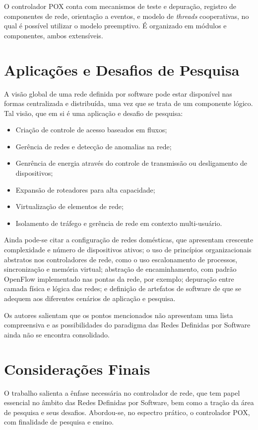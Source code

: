 O controlador POX conta com mecanismos de teste e depuração, registro de componentes de rede, orientação a eventos, e modelo de \textit{threads} cooperativas, no qual é possível utilizar o modelo preemptivo. É organizado em módulos e componentes, ambos extensíveis.


\section*{Aplicações e Desafios de Pesquisa}

A visão global de uma rede definida por software pode estar disponível nas formas centralizada e distribuída, uma vez que se trata de um componente lógico. Tal visão, que em si é uma aplicação e desafio de pesquisa:

\vspace{-15pt}
\begin{itemize}
  \item Criação de controle de acesso baseados em fluxos;
  \item Gerência de redes e detecção de anomalias na rede;
  \item Genrência de energia através do controle de transmissão ou desligamento de dispositivos;
  \item Expansão de roteadores para alta capacidade;
  \item Virtualização de elementos de rede;
  \item Isolamento de tráfego e gerência de rede em contexto multi-usuário.
\end{itemize}

Ainda pode-se citar a configuração de redes domésticas, que apresentam crescente complexidade e número de dispositivos ativos; o uso de princípios organizacionais abstratos nos controladores de rede, como o uso escalonamento de processos, sincronização e memória virtual; abstração de encaminhamento, com padrão OpenFlow implementado nas pontas da rede, por exemplo; depuração entre camada física e lógica das redes; e definição de artefatos de software de que se adequem aos diferentes cenários de aplicação e pesquisa.

Os autores salientam que os pontos mencionados não apresentam uma lista compreensiva e as possibilidades do paradigma das Redes Definidas por Software ainda não se encontra consolidado.


\section*{Considerações Finais}

O trabalho salienta a ênfase necessária no controlador de rede, que tem papel essencial no âmbito das Redes Definidas por Software, bem como a tração da área de pesquisa e seus desafios. Abordou-se, no espectro prático, o controlador POX, com finalidade de pesquisa e ensino.
